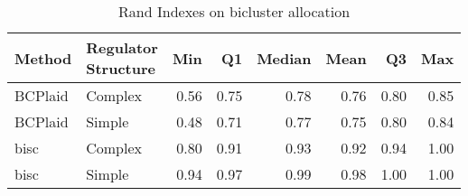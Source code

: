 \begin{table}[ht]
\caption{Rand Indexes on bicluster allocation}
\vspace{1.5cm}
\centering
\begin{tabular}{llrrrrrr}
  \toprule
Method & \makecell{Regulator \\ Structure} & Min & Q1 & Median & Mean & Q3 & Max \\ 
  \midrule
BCPlaid & Complex & 0.56 & 0.75 & 0.78 & 0.76 & 0.80 & 0.85 \\ 
  BCPlaid & Simple & 0.48 & 0.71 & 0.77 & 0.75 & 0.80 & 0.84 \\ 
  bisc & Complex & 0.80 & 0.91 & 0.93 & 0.92 & 0.94 & 1.00 \\ 
  bisc & Simple & 0.94 & 0.97 & 0.99 & 0.98 & 1.00 & 1.00 \\ 
   \bottomrule
\end{tabular}
\end{table}
